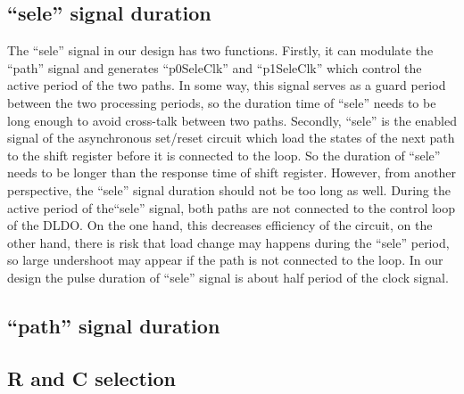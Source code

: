 \documentclass[journal]{IEEEtran}
\begin{document}
\subsection{``sele'' signal duration}
The ``sele'' signal in  our design has two functions. Firstly, it can modulate the ``path'' signal and generates ``p0SeleClk'' and ``p1SeleClk'' which control the active period of the two paths. In some way, this signal serves as a guard period between the two processing periods, so the duration time of ``sele'' needs to be long enough to avoid cross-talk between two paths. Secondly, ``sele'' is the enabled signal of the asynchronous set/reset circuit which load the states of the next path to the shift register before it is connected to the loop. So the duration of ``sele'' needs to be longer than the response time of shift register. However, from another perspective, the ``sele'' signal duration should not be too long as well. During the active period of the``sele'' signal, both paths are not connected to the control loop of the DLDO. On the one hand, this decreases efficiency of the circuit, on the other hand, there is risk that load change may happens during the ``sele'' period, so large undershoot may appear if the path is not connected to the loop. In our design the pulse duration of ``sele'' signal is about half period of the clock signal. 
\subsection{``path'' signal duration}

\subsection{R and C selection}
\end{document}
